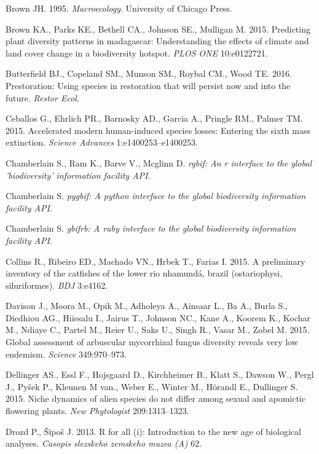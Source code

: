 \documentclass[author-year, review, 11pt]{components/elsarticle} %
\begin{document}
\hypertarget{ref-Brown_1995}{}
Brown JH. 1995. \emph{Macroecology}. University of Chicago Press.

\hypertarget{ref-Brown_2015}{}
Brown KA., Parks KE., Bethell CA., Johnson SE., Mulligan M. 2015.
Predicting plant diversity patterns in madagascar: Understanding the
effects of climate and land cover change in a biodiversity hotspot.
\emph{PLOS ONE} 10:e0122721.

\hypertarget{ref-Butterfield_2016}{}
Butterfield BJ., Copeland SM., Munson SM., Roybal CM., Wood TE. 2016.
Prestoration: Using species in restoration that will persist now and
into the future. \emph{Restor Ecol}.

\hypertarget{ref-Ceballos_2015}{}
Ceballos G., Ehrlich PR., Barnosky AD., Garcia A., Pringle RM., Palmer
TM. 2015. Accelerated modern human-induced species losses: Entering the
sixth mass extinction. \emph{Science Advances} 1:e1400253--e1400253.

\hypertarget{ref-rgbif}{}
Chamberlain S., Ram K., Barve V., Mcglinn D. \emph{rgbif: An r interface
to the global 'biodiversity' information facility API}.

\hypertarget{ref-pygbif}{}
Chamberlain S. \emph{pygbif: A python interface to the global
biodiversity information facility API}.

\hypertarget{ref-gbifrb}{}
Chamberlain S. \emph{gbifrb: A ruby interface to the global biodiversity
information facility API}.

\hypertarget{ref-Collins_2015}{}
Collins R., Ribeiro ED., Machado VN., Hrbek T., Farias I. 2015. A
preliminary inventory of the catfishes of the lower rio nhamundá, brazil
(ostariophysi, siluriformes). \emph{BDJ} 3:e4162.

\hypertarget{ref-Davison_2015}{}
Davison J., Moora M., Opik M., Adholeya A., Ainsaar L., Ba A., Burla S.,
Diedhiou AG., Hiiesalu I., Jairus T., Johnson NC., Kane A., Koorem K.,
Kochar M., Ndiaye C., Partel M., Reier U., Saks U., Singh R., Vasar M.,
Zobel M. 2015. Global assessment of arbuscular mycorrhizal fungus
diversity reveals very low endemism. \emph{Science} 349:970--973.

\hypertarget{ref-Dellinger_2015}{}
Dellinger AS., Essl F., Hojsgaard D., Kirchheimer B., Klatt S., Dawson
W., Pergl J., Pyšek P., Kleunen M van., Weber E., Winter M., Hörandl E.,
Dullinger S. 2015. Niche dynamics of alien species do not differ among
sexual and apomictic flowering plants. \emph{New Phytologist}
209:1313--1323.

\hypertarget{ref-Drozd_2013}{}
Drozd P., Šipoš J. 2013. R for all (i): Introduction to the new age of
biological analyses. \emph{Casopis slezskeho zemskeho muzea (A)} 62.
\end{document}
